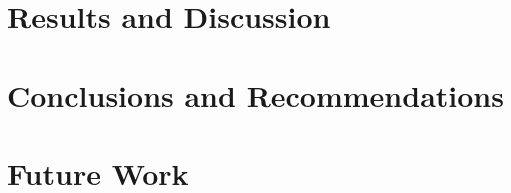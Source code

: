 \documentclass[conference,a4paper,draftcls]{IEEEtran}
\begin{document}
\section{Results and Discussion}

\section{Conclusions and Recommendations}


\section{Future Work}

\printbibliography
\end{document}
